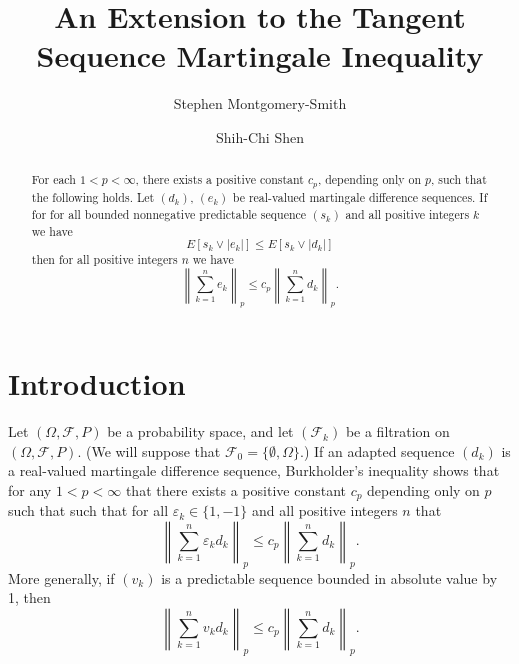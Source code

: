 \documentclass[12pt]{amsart}
\begin{document}
\title[Extension to a Martingale Inequality]{An Extension to the Tangent Sequence Martingale Inequality}
\author{Stephen Montgomery-Smith}
\address{Department of Mathematics,\\
University of Missouri\\
Columbia, Missouri 65211, USA.\\
\tt stephen@math.missouri.edu}
\author{ Shih-Chi Shen }
\address{Department of Mathematics,\\
University of Missouri\\
Columbia, Missouri 65211, USA.\\
\tt mathgr75@math.missouri.edu} \maketitle

\begin{abstract}
For each $1<p<\infty$, there exists a positive constant $c_p$, 
depending only on $p$, such
that the following holds.  Let $(d_k)$, $(e_k)$ be real-valued martingale
difference sequences. If for for all bounded nonnegative predictable 
sequence $(s_k)$ and all positive integers $k$ we have
\[E[s_k \vee |e_k|]\leq E[s_k \vee |d_k|]\]
then for all positive integers $n$ we have
\[ \left\| \sum_{k=1}^n e_k \right\|_p 
\leq  c_p \left\| \sum_{k=1}^n d_k \right\|_p .\]
\end{abstract}
\maketitle

\section{Introduction}
Let $(\Omega ,\mathcal{F},P)$ be a probability space, and let
$(\mathcal{F}_k)$ be a filtration on $(\Omega ,\mathcal{F},P)$. 
(We will suppose that $\mathcal{F}_0 = \{\emptyset,\Omega\}$.)
If an adapted sequence $(d_k)$
is a real-valued martingale difference sequence, Burkholder's
inequality \cite{B2} shows that for any $1<p<\infty$ that there exists
a positive constant $c_p$ depending
only on $p$ such that such that
for all $\varepsilon _k \in \{1,-1\}$ and all positive integers $n$ that
\[ \left\| \sum_{k=1}^n \varepsilon _k d_k \right\|_p 
\leq c_p \left\| \sum_{k=1}^n d_k \right\|_p .\]
More generally, if $(v_k)$ is a predictable sequence bounded
in absolute value by 1, then
\[ \left \| \sum_{k=1}^n v_k d_k \right\|_p 
\leq c_p \left\| \sum_{k=1}^n d_k \right\|_p .\]
\end{document}
